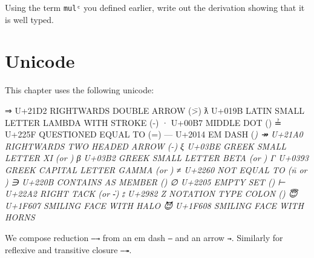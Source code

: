 Using the term \texttt{mulᶜ} you defined earlier, write out the
derivation showing that it is well typed.

\begin{fence}
\begin{code}%
\>[0]\<%
\end{code}
\end{fence}

\hypertarget{unicode}{%
\section{Unicode}\label{unicode}}

This chapter uses the following unicode:

\begin{myDisplay}
⇒  U+21D2  RIGHTWARDS DOUBLE ARROW (\=>)
ƛ  U+019B  LATIN SMALL LETTER LAMBDA WITH STROKE (\Gl-)
·  U+00B7  MIDDLE DOT (\cdot)
≟  U+225F  QUESTIONED EQUAL TO (\?=)
—  U+2014  EM DASH (\em)
↠  U+21A0  RIGHTWARDS TWO HEADED ARROW (\rr-)
ξ  U+03BE  GREEK SMALL LETTER XI (\Gx or \xi)
β  U+03B2  GREEK SMALL LETTER BETA (\Gb or \beta)
Γ  U+0393  GREEK CAPITAL LETTER GAMMA (\GG or \Gamma)
≠  U+2260  NOT EQUAL TO (\=n or \ne)
∋  U+220B  CONTAINS AS MEMBER (\ni)
∅  U+2205  EMPTY SET (\0)
⊢  U+22A2  RIGHT TACK (\vdash or \|-)
⦂  U+2982  Z NOTATION TYPE COLON (\:)
😇  U+1F607  SMILING FACE WITH HALO
😈  U+1F608  SMILING FACE WITH HORNS
\end{myDisplay}

We compose reduction \texttt{—→} from an em dash \texttt{—} and an arrow
\texttt{→}. Similarly for reflexive and transitive closure \texttt{—↠}.

